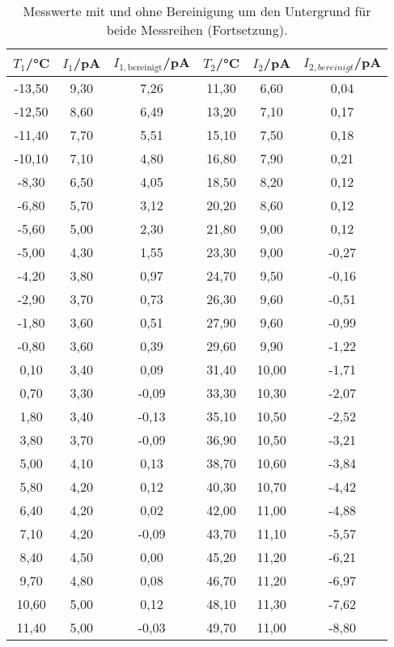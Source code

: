  \begin{table}[htp]
  	\begin{center}
      \caption{Messwerte mit und ohne Bereinigung um den Untergrund für beide Messreihen (Fortsetzung).}
      \label{tab:messwerte2}
  		\begin{tabular}{cccccc}
  		\toprule
  			{$T_1$/°C} & {$I_1$/pA} & {$I_{1,\text{bereinigt}}$/pA} & {$T_2$/°C} & {$I_2$/pA} & {$I_{2,bereinigt}$/pA}\\
  			\midrule
				-13,50 & 9,30 & 7,26  & 11,30 & 6,60 & 0,04\\
				-12,50 & 8,60 & 6,49  & 13,20 & 7,10 & 0,17\\
				-11,40 & 7,70 & 5,51  & 15,10 & 7,50 & 0,18\\
				-10,10 & 7,10 & 4,80  & 16,80 & 7,90 & 0,21\\
				-8,30  & 6,50 & 4,05  & 18,50 & 8,20 & 0,12\\
				-6,80  & 5,70 & 3,12  & 20,20 & 8,60 & 0,12\\
				-5,60  & 5,00 & 2,30  & 21,80 & 9,00 & 0,12\\
				-5,00  & 4,30 & 1,55  & 23,30 & 9,00 & -0,27\\
				-4,20  & 3,80 & 0,97  & 24,70 & 9,50 & -0,16\\
				-2,90  & 3,70 & 0,73  & 26,30 & 9,60 & -0,51\\
				-1,80  & 3,60 & 0,51  & 27,90 & 9,60 & -0,99\\
				-0,80  & 3,60 & 0,39  & 29,60 & 9,90 & -1,22\\
				0,10 	 & 3,40 & 0,09  & 31,40 & 10,00& -1,71\\
				0,70 	 & 3,30 & -0,09 & 33,30 & 10,30& -2,07\\
				1,80 	 & 3,40 & -0,13 & 35,10 & 10,50& -2,52\\
				3,80 	 & 3,70 & -0,09 & 36,90 & 10,50& -3,21\\
				5,00 	 & 4,10 & 0,13  & 38,70 & 10,60& -3,84\\
				5,80 	 & 4,20 & 0,12  & 40,30 & 10,70& -4,42\\
				6,40 	 & 4,20 & 0,02  & 42,00 & 11,00& -4,88\\
				7,10 	 & 4,20 & -0,09 & 43,70 & 11,10& -5,57\\
				8,40 	 & 4,50 & 0,00  & 45,20 & 11,20& -6,21\\
				9,70 	 & 4,80 & 0,08  & 46,70 & 11,20& -6,97\\
				10,60  & 5,00 & 0,12  & 48,10 & 11,30& -7,62\\
				11,40  & 5,00 & -0,03 & 49,70 & 11,00& -8,80\\

\end{tabular}
\end{center}
\end{table}
